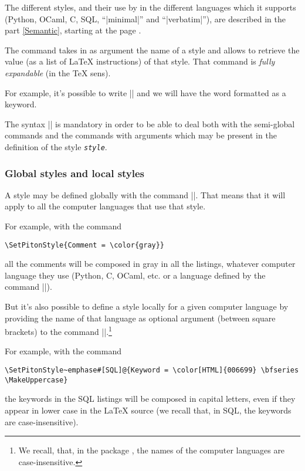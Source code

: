 \documentclass{article}
\begin{document}
\bigskip
The different styles, and their use by  in the different languages
which it supports (Python, OCaml, C, SQL, ``|minimal|'' and ``|verbatim|''),
are described in the part \ref{Semantic}, starting at the page
\pageref{Semantic}.  


\bigskip
{}
The command  takes in as argument the name of a
style and allows to retrieve the value (as a list of LaTeX instructions) of
that style. That command is \emph{fully expandable} (in the TeX sens).

\smallskip
For example, it's possible to write |{}| and we
will have the word {} formatted as a keyword.

\smallskip
The syntax |{}| is mandatory in
order to be able to deal both with the semi-global commands and the commands
with arguments which may be present in the definition of the style
\texttt{\textsl{style}}. 

\bigskip
\subsubsection{Global styles and local styles}

A style may be defined globally with the command |\SetPitonStyle|. That means
that it will apply to all the computer languages that use that style.

\bigskip
For example, with the command
\begin{Verbatim}
\SetPitonStyle{Comment = \color{gray}}
\end{Verbatim}
all the comments will be composed in gray in all the listings, whatever
computer language they use (Python, C, OCaml, etc. or a language defined by
the command |\NewPitonLanguage|).

\bigskip
But it's also possible to define a style locally for a given computer
language by providing the name of that language as optional argument (between
square brackets) to the command |\SetPitonStyle|.\footnote{We recall, that, in
the package , the names of the computer languages are
case-insensitive.}

\bigskip
For example, with the command
\begin{Verbatim}
\SetPitonStyle~emphase#[SQL]@{Keyword = \color[HTML]{006699} \bfseries \MakeUppercase}
\end{Verbatim}
the keywords in the SQL listings will be composed in capital letters, even if
they appear in lower case in the LaTeX source (we recall that, in SQL, the
keywords are case-insensitive).
\end{document}
